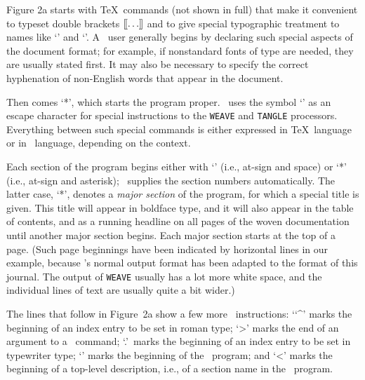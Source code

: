 Figure 2a starts with \TeX\ commands (not shown in full) that make it
convenient to typeset double brackets $[\mkern-2mu[\ldots]\mkern-2mu]$
and to give special typographic treatment to names like `\WEB' and `\PASCAL'.
A \WEB\ user generally begins by declaring such special aspects of the
document format; for example, if nonstandard fonts of type are needed,
they are usually stated first. It may also be necessary to specify the
correct hyphenation of non-English words that appear in the document.

Then comes `{\tt@*}', which starts the program proper. \WEB\ uses the
symbol `{\tt@}' as an escape character for special instructions to the
{\tt WEAVE} and {\tt TANGLE} processors. Everything between such special
commands is either expressed in \TeX\ language or in \PASCAL\ language,
depending on the context.

Each section of the program begins either with `{\tt@ }' (i.e., at-sign
and space) or `{\tt@*}' (i.e., at-sign and asterisk); \WEB\ supplies the
section numbers automatically. The latter case, `{\tt@*}', denotes a
{\it major section\/} of the program, for which a special title is given.
This title will appear in boldface type, and it will also appear in the
table of contents, and as a running headline on all pages of the
woven documentation until another major section begins. Each major section
starts at the top of a page. (Such page beginnings have been indicated
by horizontal lines in our example, because \WEB's normal output format
has been adapted to the format of this journal. The output of {\tt WEAVE}
usually has a lot more white space, and the individual lines of text
are usually quite a bit wider.)

The lines that follow in Figure~2a show a few more \WEB\ instructions:
`{\tt@\char`^}' marks the beginning of an index entry to be set in roman
type; `{\tt@>}' marks the end of an argument to a \WEB\ command;
`{\tt@.}'\ marks the beginning of an index entry to be set in typewriter
type; `{\tt@p}' marks the beginning of the \PASCAL\ program; and `{\tt@<}'
marks the beginning of a top-level description, i.e., of a section
name in the \WEB\ program.


